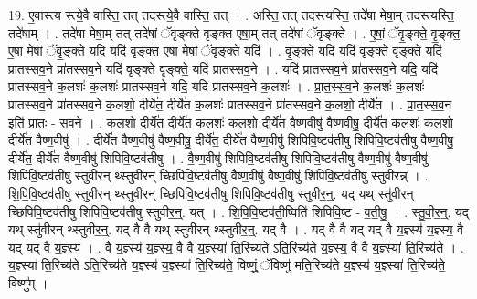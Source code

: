 \documentclass[17pt]{extarticle}
\begin{document}
19. ए॒वास्त्य स्त्ये॒वै वास्ति॒ तत् तदस्त्ये॒वै वास्ति॒ तत् । . अस्ति॒ तत् तदस्त्यस्ति॒ तदे॑षा मेषा॒म् तदस्त्यस्ति॒ तदे॑षाम् । . तदे॑षा मेषा॒म् तत् तदे॑षां ॅवृङ्क्ते वृङ्क्त एषा॒म् तत् तदे॑षां ॅवृङ्क्ते । . ए॒षां॒ ॅवृ॒ङ्क्ते॒ वृ॒ङ्क्त॒ ए॒षा॒ मे॒षां॒ ॅवृ॒ङ्क्ते॒ यदि॒ यदि॑ वृङ्क्त एषा मेषां ॅवृङ्क्ते॒ यदि॑ । . वृ॒ङ्क्ते॒ यदि॒ यदि॑ वृङ्क्ते वृङ्क्ते॒ यदि॑ प्रातस्सव॒ने प्रा॑तस्सव॒ने यदि॑ वृङ्क्ते वृङ्क्ते॒ यदि॑ प्रातस्सव॒ने । . यदि॑ प्रातस्सव॒ने प्रा॑तस्सव॒ने यदि॒ यदि॑ प्रातस्सव॒ने क॒लशः॑ क॒लशः॑ प्रातस्सव॒ने यदि॒ यदि॑ प्रातस्सव॒ने क॒लशः॑ । . प्रा॒त॒स्स॒व॒ने क॒लशः॑ क॒लशः॑ प्रातस्सव॒ने प्रा॑तस्सव॒ने क॒लशो॒ दीर्ये॑त॒ दीर्ये॑त क॒लशः॑ प्रातस्सव॒ने प्रा॑तस्सव॒ने क॒लशो॒ दीर्ये॑त । . प्रा॒त॒स्स॒व॒न इति॑ प्रातः - स॒व॒ने । . क॒लशो॒ दीर्ये॑त॒ दीर्ये॑त क॒लशः॑ क॒लशो॒ दीर्ये॑त वैष्ण॒वीषु॑ वैष्ण॒वीषु॒ दीर्ये॑त क॒लशः॑ क॒लशो॒ दीर्ये॑त वैष्ण॒वीषु॑ । . दीर्ये॑त वैष्ण॒वीषु॑ वैष्ण॒वीषु॒ दीर्ये॑त॒ दीर्ये॑त वैष्ण॒वीषु॑ शिपिवि॒ष्टव॑तीषु शिपिवि॒ष्टव॑तीषु वैष्ण॒वीषु॒ दीर्ये॑त॒ दीर्ये॑त वैष्ण॒वीषु॑ शिपिवि॒ष्टव॑तीषु । . वै॒ष्ण॒वीषु॑ शिपिवि॒ष्टव॑तीषु शिपिवि॒ष्टव॑तीषु वैष्ण॒वीषु॑ वैष्ण॒वीषु॑ शिपिवि॒ष्टव॑तीषु स्तुवीरन् थ्स्तुवीरन् च्छिपिवि॒ष्टव॑तीषु वैष्ण॒वीषु॑ वैष्ण॒वीषु॑ शिपिवि॒ष्टव॑तीषु स्तुवीरन्न् । . शि॒पि॒वि॒ष्टव॑तीषु स्तुवीरन् थ्स्तुवीरन् च्छिपिवि॒ष्टव॑तीषु शिपिवि॒ष्टव॑तीषु स्तुवीर॒न्॒. यद् यथ् स्तु॑वीरन् च्छिपिवि॒ष्टव॑तीषु शिपिवि॒ष्टव॑तीषु स्तुवीर॒न्॒. यत् । . शि॒पि॒वि॒ष्टव॑ती॒ष्विति॑ शिपिवि॒ष्ट - व॒ती॒षु॒ । . स्तु॒वी॒र॒न्॒. यद् यथ् स्तु॑वीरन् थ्स्तुवीर॒न्॒. यद् वै वै यथ् स्तु॑वीरन् थ्स्तुवीर॒न्॒. यद् वै । . यद् वै वै यद् यद् वै य॒ज्ञ्स्य॑ य॒ज्ञ्स्य॒ वै यद् यद् वै य॒ज्ञ्स्य॑ । . वै य॒ज्ञ्स्य॑ य॒ज्ञ्स्य॒ वै वै य॒ज्ञ्स्या॑ ति॒रिच्य॑ते ऽति॒रिच्य॑ते य॒ज्ञ्स्य॒ वै वै य॒ज्ञ्स्या॑ ति॒रिच्य॑ते । . य॒ज्ञ्स्या॑ ति॒रिच्य॑ते ऽति॒रिच्य॑ते य॒ज्ञ्स्य॑ य॒ज्ञ्स्या॑ ति॒रिच्य॑ते॒ विष्णुं॒ ॅविष्णु॑ मति॒रिच्य॑ते य॒ज्ञ्स्य॑ य॒ज्ञ्स्या॑ ति॒रिच्य॑ते॒ विष्णु᳚म् । \newline
\end{document}

